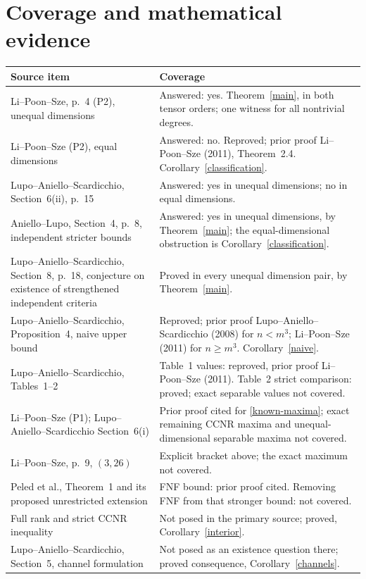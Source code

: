 \documentclass[11pt]{article}
\begin{document}
\section{Coverage and mathematical evidence}
{\small
\begin{longtable}{@{}p{.43\linewidth}p{.53\linewidth}@{}}
\toprule Source item & Coverage\\\midrule\endhead
Li--Poon--Sze, p.~4 (P2), unequal dimensions &
Answered: yes. Theorem~\ref{main}, in both tensor orders; one witness
for all nontrivial degrees.\\
Li--Poon--Sze (P2), equal dimensions & Answered: no.
Reproved; prior proof Li--Poon--Sze (2011), Theorem~2.4.
Corollary~\ref{classification}.\\
Lupo--Aniello--Scardicchio, Section~6(ii), p.~15 &
Answered: yes in unequal dimensions; no in equal dimensions.\\
Aniello--Lupo, Section~4, p.~8, independent stricter bounds &
Answered: yes in unequal dimensions, by Theorem~\ref{main}; the
equal-dimensional obstruction is Corollary~\ref{classification}.\\
Lupo--Aniello--Scardicchio, Section~8, p.~18, conjecture on existence
of strengthened independent criteria & Proved in every unequal dimension
pair, by Theorem~\ref{main}.\\
Lupo--Aniello--Scardicchio, Proposition~4, naive upper bound &
Reproved; prior proof Lupo--Aniello--Scardicchio (2008) for $n<m^3$;
Li--Poon--Sze (2011) for $n\ge m^3$. Corollary~\ref{naive}.\\
Lupo--Aniello--Scardicchio, Tables~1--2 & Table~1 values:
reproved, prior proof Li--Poon--Sze (2011). Table~2 strict comparison:
proved; exact separable values not covered.\\
Li--Poon--Sze (P1); Lupo--Aniello--Scardicchio Section~6(i) &
Prior proof cited for \eqref{known-maxima}; exact remaining CCNR maxima
and unequal-dimensional separable maxima not covered.\\
Li--Poon--Sze, p.~9, $(3,26)$ & Explicit bracket above;
the exact maximum not covered.\\
Peled et al., Theorem~1 and its proposed unrestricted extension &
FNF bound: prior proof cited. Removing FNF from that stronger bound:
not covered.\\
Full rank and strict CCNR inequality & Not posed in the primary source;
proved, Corollary~\ref{interior}.\\
Lupo--Aniello--Scardicchio, Section~5, channel formulation &
Not posed as an existence question there; proved consequence,
Corollary~\ref{channels}.\\\bottomrule
\end{longtable}}
\end{document}
